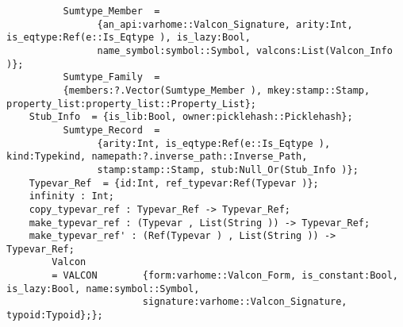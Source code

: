\begin{verbatim}
          Sumtype_Member  =
                {an_api:varhome::Valcon_Signature, arity:Int, is_eqtype:Ref(e::Is_Eqtype ), is_lazy:Bool,
                name_symbol:symbol::Symbol, valcons:List(Valcon_Info )};
          Sumtype_Family  =
          {members:?.Vector(Sumtype_Member ), mkey:stamp::Stamp, property_list:property_list::Property_List};
    Stub_Info  = {is_lib:Bool, owner:picklehash::Picklehash};
          Sumtype_Record  =
                {arity:Int, is_eqtype:Ref(e::Is_Eqtype ), kind:Typekind, namepath:?.inverse_path::Inverse_Path,
                stamp:stamp::Stamp, stub:Null_Or(Stub_Info )};
    Typevar_Ref  = {id:Int, ref_typevar:Ref(Typevar )};
    infinity : Int;
    copy_typevar_ref : Typevar_Ref -> Typevar_Ref;
    make_typevar_ref : (Typevar , List(String )) -> Typevar_Ref;
    make_typevar_ref' : (Ref(Typevar ) , List(String )) -> Typevar_Ref;
        Valcon
        = VALCON        {form:varhome::Valcon_Form, is_constant:Bool, is_lazy:Bool, name:symbol::Symbol,
                        signature:varhome::Valcon_Signature, typoid:Typoid};};
\end{verbatim}
